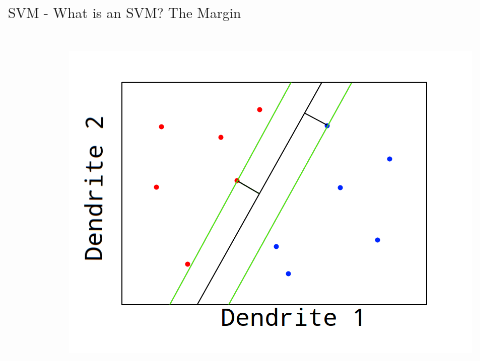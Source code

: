 \documentclass[10pt]{beamer}
\begin{document}
\begin{frame}[fragile]{SVM - What is an SVM? The Margin}
\begin{columns}[T,onlytextwidth]
\begin{center}
\end{center}
\begin{center}
\begin{figure}
      \includegraphics[height=0.9\textwidth]{svm_mar.png}
	\end{figure}
	\end{center}
\end{columns}
\end{frame}
\end{document}
